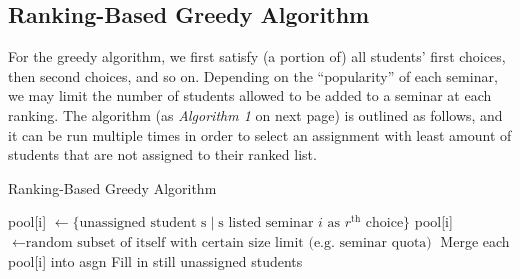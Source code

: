\documentclass{article} %
\begin{document}
\subsection{Ranking-Based Greedy Algorithm}
    \par For the greedy algorithm, we first satisfy (a portion of) all students' first choices, then second choices, and so on. Depending on the ``popularity'' of each seminar, we may limit the number of students allowed to be added to a seminar at each ranking. The algorithm (as \emph{Algorithm 1} on next page) is outlined as follows, and it can be run multiple times in order to select an assignment with least amount of students that are not assigned to their ranked list.
    \begin{algorithm}
        \caption{Ranking-Based Greedy Algorithm}
        \begin{algorithmic}
                    \State pool[i] $\gets \{\text{unassigned student s} \mid \text{s listed seminar $i$ as $r^\text{th}$ choice}\}$
                    \State pool[i] $\gets \text{random subset of itself with certain size limit (e.g. seminar quota)}$
                \EndFor
                \State Merge each pool[i] into asgn
            \EndFor
            \State Fill in still unassigned students
        \end{algorithmic}
    \end{algorithm}
\end{document}
